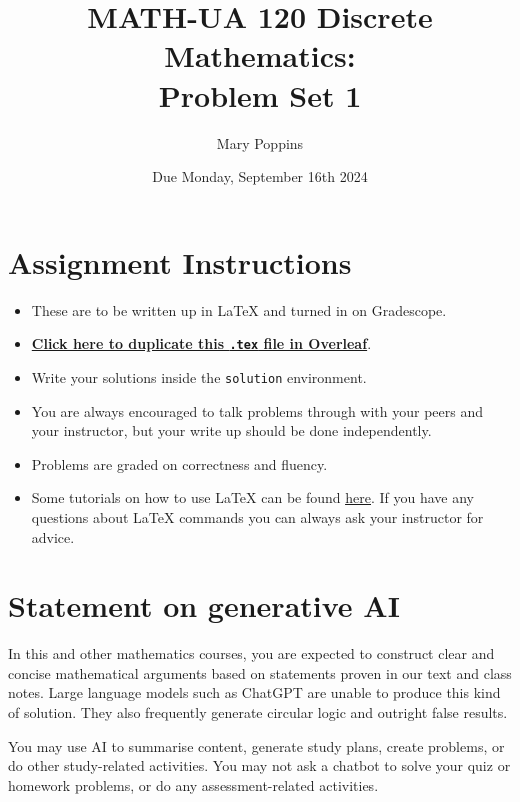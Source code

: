 \documentclass{article}
\title{\textbf{MATH-UA 120 Discrete Mathematics: \\ Problem Set 1}}
\author{%
    Mary Poppins %
}
\date{Due Monday, September 16th 2024} %
\theoremstyle{definition}
\begin{document}
\maketitle %

\vfill

\section*{Assignment Instructions}

\begin{itemize}
    \item These are to be written up in \LaTeX{} and turned in on Gradescope.
    \item \href{https://bit.ly/4d4g2BH}{\textbf{Click here to duplicate this \texttt{.tex} file in Overleaf}}.
    \item Write your solutions inside the \texttt{solution} environment.
    \item You are always encouraged to talk problems through with your peers and your instructor, but your write up should be done independently.
    \item Problems are graded on correctness and fluency.
    \item Some tutorials on how to use \LaTeX{} can be found \href{https://www.overleaf.com/learn/latex/Tutorials}{\underline{here}}. If you have any questions about \LaTeX{} commands you can always ask your instructor for advice.
\end{itemize}

\vfill

\section*{Statement on generative AI}

In this and other mathematics courses, you are expected to construct clear and concise mathematical arguments based on statements proven in our text and class notes. Large language models such as ChatGPT are unable to produce this kind of solution. They also frequently generate circular logic and outright false results.
 
You may use AI to summarise content, generate study plans, create problems, or do other study-related activities. You may not ask a chatbot to solve your quiz or homework problems, or do any assessment-related activities.
 
\end{document}
